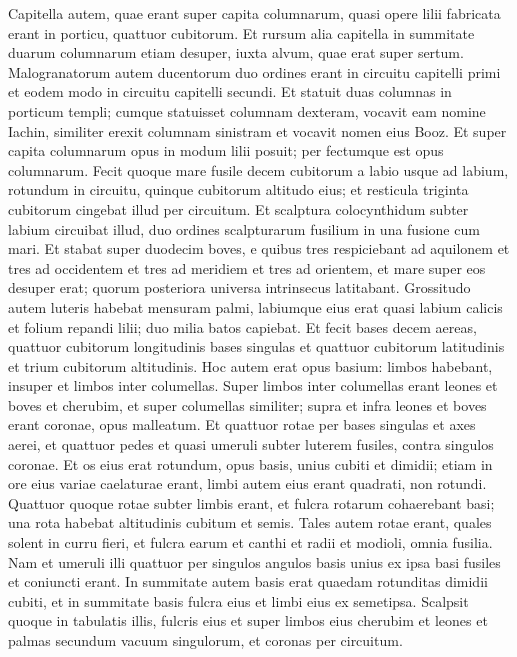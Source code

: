 \begin{biblechapter}
\verse Capitella autem, quae erant super capita columnarum, quasi opere lilii fabricata erant in porticu, quattuor cubitorum. 
\verse Et rursum alia capitella in summitate duarum columnarum etiam desuper, iuxta alvum, quae erat super sertum. Malogranatorum autem ducentorum duo ordines erant in circuitu capitelli primi et eodem modo in circuitu capitelli secundi. 
\verse Et statuit duas columnas in porticum templi; cumque statuisset columnam dexteram, vocavit eam nomine Iachin, similiter erexit columnam sinistram et vocavit nomen eius Booz. 
\verse Et super capita columnarum opus in modum lilii posuit; per fectumque est opus columnarum. 
\verse Fecit quoque mare fusile decem cubitorum a labio usque ad labium, rotundum in circuitu, quinque cubitorum altitudo eius; et resticula triginta cubitorum cingebat illud per circuitum. 
\verse Et scalptura colocynthidum subter labium circuibat illud, duo ordines scalpturarum fusilium in una fusione cum mari. 
\verse Et stabat super duodecim boves, e quibus tres respiciebant ad aquilonem et tres ad occidentem et tres ad meridiem et tres ad orientem, et mare super eos desuper erat; quorum posteriora universa intrinsecus latitabant. 
\verse Grossitudo autem luteris habebat mensuram palmi, labiumque eius erat quasi labium calicis et folium repandi lilii; duo milia batos capiebat. 
\verse Et fecit bases decem aereas, quattuor cubitorum longitudinis bases singulas et quattuor cubitorum latitudinis et trium cubitorum altitudinis. 
\verse Hoc autem erat opus basium: limbos habebant, insuper et limbos inter columellas.  
\verse Super limbos inter columellas erant leones et boves et cherubim, et super columellas similiter; supra et infra leones et boves erant coronae, opus malleatum. 
\verse Et quattuor rotae per bases singulas et axes aerei, et quattuor pedes et quasi umeruli subter luterem fusiles, contra singulos coronae.  
\verse Et os eius erat rotundum, opus basis, unius cubiti et dimidii; etiam in ore eius variae caelaturae erant, limbi autem eius erant quadrati, non rotundi.  
\verse Quattuor quoque rotae subter limbis erant, et fulcra rotarum cohaerebant basi; una rota habebat altitudinis cubitum et semis. 
\verse Tales autem rotae erant, quales solent in curru fieri, et fulcra earum et canthi et radii et modioli, omnia fusilia. 
\verse Nam et umeruli illi quattuor per singulos angulos basis unius ex ipsa basi fusiles et coniuncti erant. 
\verse In summitate autem basis erat quaedam rotunditas dimidii cubiti, et in summitate basis fulcra eius et limbi eius ex semetipsa. 
\verse Scalpsit quoque in tabulatis illis, fulcris eius et super limbos eius cherubim et leones et palmas secundum vacuum singulorum, et coronas per circuitum. 

\end{biblechapter}
